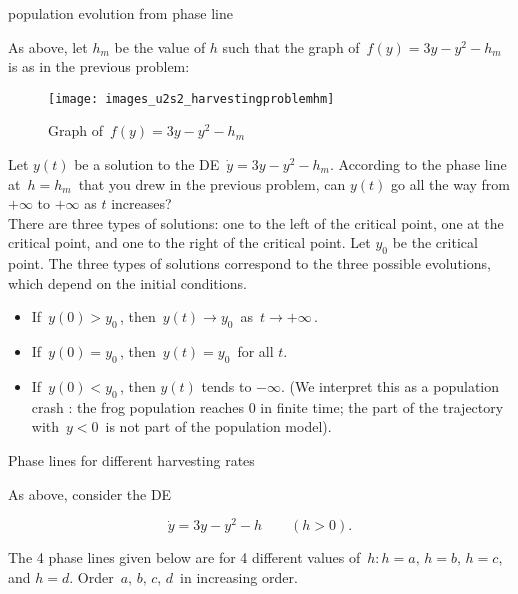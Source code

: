 \clearpage

\begin{exercise}
  population evolution from phase line
\end{exercise}

As above, let $h_m$ be the value of $h$ such that
the graph of $\, f(y) = 3y − y^2 − h_m\,$ is as in the previous problem:

\begin{figure}[ht!]
  \centering
  \texttt{[image: images\_u2s2\_harvestingproblemhm]}
  \caption{Graph of $\, f(y) = 3y - y^2 - h_m \,$}
\end{figure}

Let $y(t)$ be a solution to the DE $\, \dot y = 3y − y^2 −h_m$.
According to the phase line at $\, h = h_m\,$ that you drew in the previous problem,
can $y(t)$ go all the way from $ + \infty$ to $ + \infty$ as $t$ increases? \\

There are three types of solutions: one to the left of the critical point,
one at the critical point, and one to the right of the critical point.
Let $y_0$ be the critical point.
The three types of solutions correspond to the three possible evolutions,
which depend on the initial conditions.

\begin{itemize}
\item If $\, y(0)> y_0\,$, then $\, y(t) \to y_0 \,$ as $\, t \to + \infty \,$.
\item If $\, y(0) =  y_0\,$, then $\, y(t) =  y_0 \,$ for all $t$.
\item If $\, y(0) < y_0\,$, then $y(t)$ tends to $- \infty$.
  (We interpret this as a population crash : the frog population reaches $0$ in finite time;
  the part of the trajectory with $\, y<0 \,$ is not part of the population model).
\end{itemize}

\clearpage

\begin{exercise}
  Phase lines for different harvesting rates
\end{exercise}

As above, consider the DE

\begin{equation*}
  \dot y = 3y - y^2 - h \qquad (h > 0). 
\end{equation*}

The 4 phase lines given below are for 4 different values of
$\, h: h=a,\, h=b, \, h=c,\,$ and $h=d$.
Order $\,a,\, b,\, c,\, d\, $ in increasing order.


